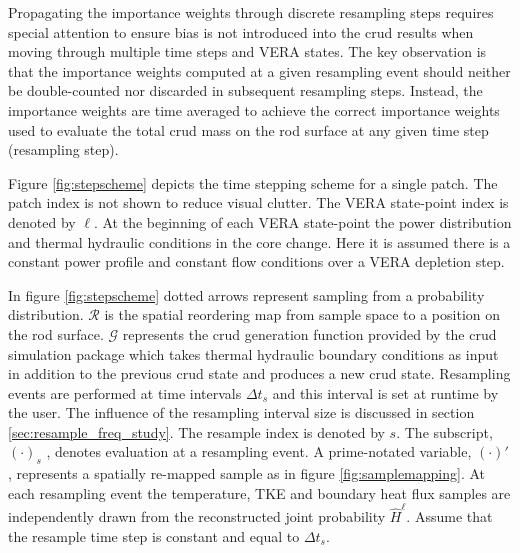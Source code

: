 Propagating the importance weights through discrete resampling steps requires special attention to ensure bias is not introduced into the crud results when moving through multiple time steps and VERA states.  The key observation is that the importance weights computed at a given resampling event should neither be double-counted nor discarded in subsequent resampling steps.  Instead, the importance weights are time averaged to achieve the correct importance weights used to evaluate the total crud mass on the rod surface at any given time step (resampling step).

Figure \ref{fig:stepscheme} depicts the time stepping scheme for a single patch. The patch index is not shown to reduce visual clutter. The VERA state-point index is denoted by $\ell$.  At the beginning of each VERA state-point the power distribution and thermal hydraulic conditions in the core change.  Here it is assumed there is a constant power profile and constant flow conditions over a VERA depletion step.

In figure \ref{fig:stepscheme} dotted arrows represent sampling from a probability distribution.  $\mathcal R$ is the spatial reordering map from sample space to a position on the rod surface. $\mathcal G$ represents the crud generation function provided by the crud simulation package which takes thermal hydraulic boundary conditions as input in addition to the previous crud state and produces a new crud state.  Resampling events are performed at time intervals $\Delta t_s$ and this interval is set at runtime by the user.  The influence of the resampling interval size is discussed in section \ref{sec:resample_freq_study}.  The resample index is denoted by $s$.  The subscript, $(\cdot)_s$ , denotes evaluation at a resampling event.  A prime-notated variable,  $(\cdot)'$, represents a spatially re-mapped sample as in figure \ref{fig:samplemapping}.  At each resampling event the temperature, TKE and boundary heat flux samples are independently drawn from the reconstructed joint probability $\hat H^\ell$.  Assume that the resample time step is constant and equal to $\Delta t_s$.


